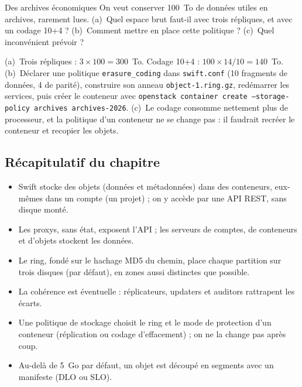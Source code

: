 \par\noindent\begin{minipage}{\linewidth}
\begin{exercice}{Des archives économiques}\label{ex:sw-archives}
On veut conserver 100~To de données utiles en archives, rarement lues. (a)~Quel espace brut faut-il avec trois répliques, et
avec un codage 10+4 ? (b)~Comment mettre en place cette politique ? (c)~Quel inconvénient prévoir ?
\end{exercice}
\begin{correction}
(a)~Trois répliques : $3 \times 100 = 300$~To. Codage 10+4 : $100 \times 14/10 = 140$~To. (b)~Déclarer une politique
\texttt{erasure\_coding} dans \texttt{swift.conf} (10 fragments de données, 4 de parité), construire son anneau
\texttt{object-1.ring.gz}, redémarrer les services, puis créer le conteneur avec
\texttt{openstack container create --storage-policy archives archives-2026}. (c)~Le codage consomme nettement plus de
processeur, et la politique d'un conteneur ne se change pas : il faudrait recréer le conteneur et recopier les objets.
\end{correction}
\end{minipage}

\subsection{Récapitulatif du chapitre}\label{sec:sw-recap}

\begin{aretenir}
\begin{itemize}
  \item Swift stocke des objets (données et métadonnées) dans des conteneurs, eux-mêmes dans un compte (un projet) ; on y
        accède par une API REST, sans disque monté.
  \item Les proxys, sans état, exposent l'API ; les serveurs de comptes, de conteneurs et d'objets stockent les données.
  \item Le ring, fondé sur le hachage MD5 du chemin, place chaque partition sur trois disques (par défaut), en zones
        aussi distinctes que possible.
  \item La cohérence est éventuelle : réplicateurs, updaters et auditors rattrapent les écarts.
  \item Une politique de stockage choisit le ring et le mode de protection d'un conteneur (réplication ou codage
        d'effacement) ; on ne la change pas après coup.
  \item Au-delà de 5~Go par défaut, un objet est découpé en segments avec un manifeste (DLO ou SLO).
\end{itemize}
\end{aretenir}

